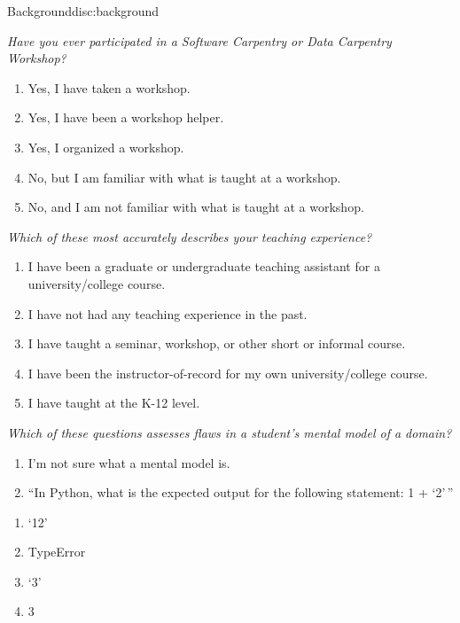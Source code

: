 \begin{discussion}{Background}{disc:background}

\emph{Have you ever participated in a Software Carpentry or Data
Carpentry Workshop?}

\begin{enumerate}
\def\labelenumi{\arabic{enumi}.}
\itemsep1pt\parskip0pt
\item
  Yes, I have taken a workshop.
\item
  Yes, I have been a workshop helper.
\item
  Yes, I organized a workshop.
\item
  No, but I am familiar with what is taught at a workshop.
\item
  No, and I am not familiar with what is taught at a workshop.
\end{enumerate}

\emph{Which of these most accurately describes your teaching
experience?}

\begin{enumerate}
\def\labelenumi{\arabic{enumi}.}
\itemsep1pt\parskip0pt
\item
  I have been a graduate or undergraduate teaching assistant for a
  university/college course.
\item
  I have not had any teaching experience in the past.
\item
  I have taught a seminar, workshop, or other short or informal course.
\item
  I have been the instructor-of-record for my own university/college
  course.
\item
  I have taught at the K-12 level.
\end{enumerate}

\emph{Which of these questions assesses flaws in a student's mental
model of a domain?}

\begin{enumerate}
\def\labelenumi{\arabic{enumi}.}
\itemsep1pt\parskip0pt
\item
  I'm not sure what a mental model is.
\item
  ``In Python, what is the expected output for the following statement:
  1 + `2'\,''
\end{enumerate}

\begin{enumerate}
\def\labelenumi{(\alph{enumi})}
\itemsep1pt\parskip0pt
\item
  `12'
\item
  TypeError
\item
  `3'
\item
  3
\end{enumerate}


\end{discussion}
